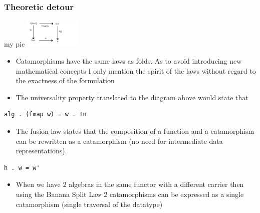 \documentclass[10pt]{beamer}
\begin{document}
\begin{frame}[fragile]
\frametitle{Theoretic detour}

\begin{block}{my pic}
\includegraphics[width=0.2\textwidth]{graf3.png}	
\end{block}
\begin{itemize}
\item Catamorphisms have the same laws as folds. As to avoid introducing new mathematical concepts I only mention the 
	spirit of the laws without regard to the exactness of the formulation 
\item The universality property translated to the diagram above would state that

\end{itemize}

\begin{lstlisting}
alg . (fmap w) = w . In
\end{lstlisting}

\begin{itemize}
	\item The fusion law states that the composition of a function and a catamorphism can be rewritten as a catamorphism (no need for intermediate data representations).
\end{itemize}

\begin{lstlisting}
h . w = w'
\end{lstlisting}

\begin{itemize}
\item When we have 2 algebras in the same functor with a different carrier then using the Banana Split Law 2 catamorphisms can be expressed as a single catamorphism (single traversal of the datatype)
\end{itemize}
\end{frame}
\end{document}
